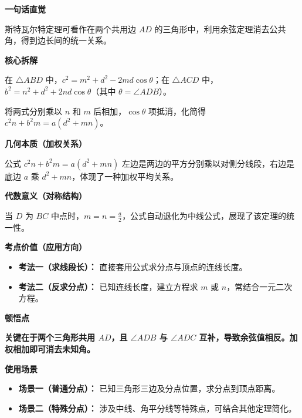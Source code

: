 \begin{explanationbox}

	\textbf{\textcolor{CExplanation}{一句话直觉}}

	斯特瓦尔特定理可看作在两个共用边 $AD$ 的三角形中，利用余弦定理消去公共角，得到边长间的统一关系。

	\medskip
	\textbf{\textcolor{CExplanation}{核心拆解}}
	\begin{description}[style=nextline, leftmargin=2.8em, labelsep=0.5em, itemsep=0.45em]
		\item[\textbf{要点一（余弦定理列式）：}] 在 $\triangle ABD$ 中，$c^{2}=m^{2}+d^{2}-2md\cos\theta$；在 $\triangle ACD$ 中，$b^{2}=n^{2}+d^{2}+2nd\cos\theta$（其中 $\theta=\angle ADB$）。
		\item[\textbf{要点二（加权相加消元）：}] 将两式分别乘以 $n$ 和 $m$ 后相加，$\cos\theta$ 项抵消，化简得 $c^{2}n+b^{2}m = a(d^{2}+mn)$。
	\end{description}

	\medskip
	\textbf{\textcolor{CExplanation}{几何本质（加权关系）}}

	公式 $c^{2}n+b^{2}m = a(d^{2}+mn)$ 左边是两边的平方分别乘以对侧分线段，右边是底边 $a$ 乘 $d^{2}+mn$，体现了一种加权平均关系。

	\medskip
	\textbf{\textcolor{CExplanation}{代数意义（对称结构）}}

	当 $D$ 为 $BC$ 中点时，$m=n=\frac{a}{2}$，公式自动退化为中线公式，展现了该定理的统一性。

	\medskip
	\textbf{\textcolor{CExplanation}{考点价值（应用方向）}}
	\begin{itemize}[leftmargin=*, itemsep=0.5em, topsep=0.4em]
		\item \textbf{考法一（求线段长）：} 直接套用公式求分点与顶点的连线长度。
		\item \textbf{考法二（反求分点）：} 已知连线长度，建立方程求 $m$ 或 $n$，常结合一元二次方程。
	\end{itemize}

	\medskip
	\textbf{\textcolor{CExplanation}{顿悟点}}

	\textbf{关键在于两个三角形共用 $AD$，且 $\angle ADB$ 与 $\angle ADC$ 互补，导致余弦值相反。加权相加即可消去未知角。}

	\medskip
	\textbf{\textcolor{CExplanation}{使用场景}}
	\begin{itemize}[leftmargin=*, itemsep=0.5em, topsep=0.4em]
		\item \textbf{场景一（普通分点）：} 已知三角形三边及分点位置，求分点到顶点距离。
		\item \textbf{场景二（特殊分点）：} 涉及中线、角平分线等特殊点，可结合其他定理简化。
	\end{itemize}
\end{explanationbox}
